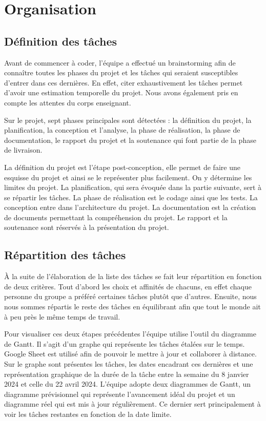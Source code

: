 \documentclass[a4paper,12pt]{article}
\begin{document}
\newpage
\section{Organisation}


\subsection{Définition des tâches}
Avant de commencer à coder, l’équipe a effectué un brainstorming afin de connaître toutes les phases du projet et les tâches qui seraient susceptibles d’entrer dans ces dernières. 
En effet, citer exhaustivement les tâches permet d’avoir une estimation temporelle du projet. 
Nous avons également pris en compte les attentes du corps enseignant.

Sur le projet, sept phases principales sont détectées : la définition du projet, la planification, la conception et l'analyse, la phase de réalisation, la phase de documentation, le rapport du projet et la soutenance qui font partie de la phase de livraison.

La définition du projet est l’étape post-conception, elle permet de faire une esquisse du projet et ainsi se le représenter plus facilement. 
On y détermine les limites du projet. 
La planification, qui sera évoquée dans la partie suivante, sert à se répartir les tâches. 
La phase de réalisation est le codage ainsi que les tests. 
La conception entre dans l’architecture du projet. 
La documentation est la création de documents permettant la compréhension du projet. 
Le rapport et la soutenance sont réservés à la présentation du projet.

\subsection{Répartition des tâches}
À la suite de l’élaboration de la liste des tâches se fait leur répartition en fonction de deux critères. 
Tout d’abord les choix et affinités de chacuns, en effet chaque personne du groupe a préféré certaines tâches plutôt que d’autres. 
Ensuite, nous nous sommes répartis le reste des tâches en équilibrant afin que tout le monde ait à peu près le même temps de travail.

Pour visualiser ces deux étapes précédentes l’équipe utilise l'outil du diagramme de Gantt. 
Il s’agit d’un graphe qui représente les tâches étalées sur le temps. 
Google Sheet est utilisé afin de pouvoir le mettre à jour et collaborer à distance.
Sur le graphe sont présentes les tâches, les dates encadrant ces dernières et une représentation graphique de la durée de la tâche entre la semaine du 8 janvier 2024 et celle du 22 avril 2024.
L’équipe adopte deux diagrammes de Gantt, un diagramme prévisionnel qui représente l’avancement idéal du projet et un diagramme réel qui est mis à jour régulièrement. 
Ce dernier sert principalement à voir les tâches restantes en fonction de la date limite.
\end{document}
